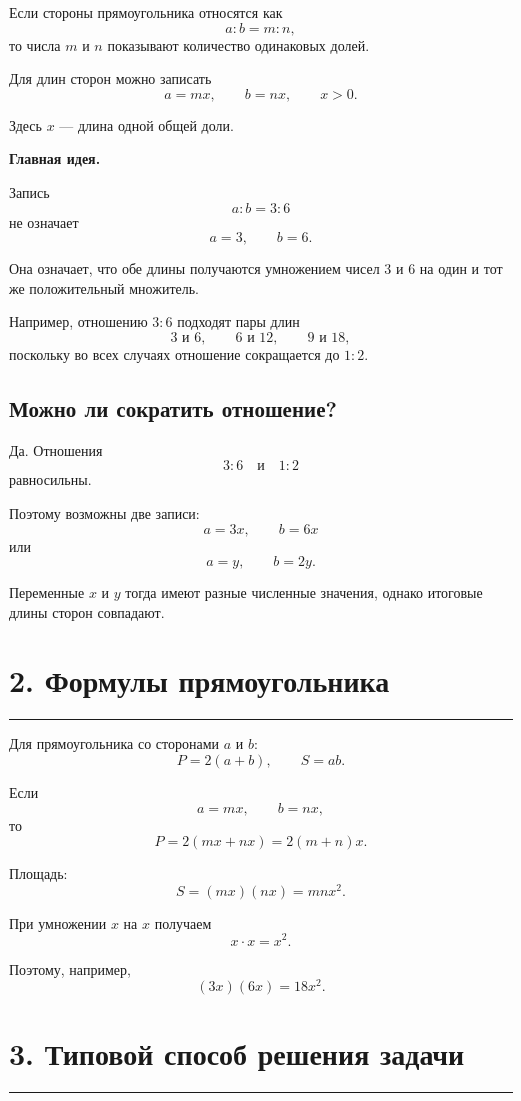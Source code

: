 \documentclass[a4paper,12pt]{article}
\newcommand{\sectionline}{%
  \par
  \noindent
  \color{accent}\rule{\linewidth}{0.45pt}
  \color{textgray}
  \par
}
\begin{document}
Если стороны прямоугольника относятся как
\[
a:b=m:n,
\]
то числа $m$ и $n$ показывают количество одинаковых долей.

Для длин сторон можно записать
\[
a=mx,
\qquad
b=nx,
\qquad
x>0.
\]

Здесь $x$ --- длина одной общей доли.

\begin{keybox}
\textbf{Главная идея.}

Запись
\[
a:b=3:6
\]
не означает
\[
a=3,
\qquad
b=6.
\]

Она означает, что обе длины получаются умножением чисел $3$ и $6$ на один и тот же положительный множитель.
\end{keybox}

Например, отношению $3:6$ подходят пары длин
\[
3\text{ и }6,
\qquad
6\text{ и }12,
\qquad
9\text{ и }18,
\]
поскольку во всех случаях отношение сокращается до $1:2$.

\subsection*{Можно ли сократить отношение?}

Да. Отношения
\[
3:6
\quad\text{и}\quad
1:2
\]
равносильны.

Поэтому возможны две записи:
\[
a=3x,
\qquad
b=6x
\]
или
\[
a=y,
\qquad
b=2y.
\]

Переменные $x$ и $y$ тогда имеют разные численные значения, однако итоговые длины сторон совпадают.

\section*{2. Формулы прямоугольника}
\sectionline

Для прямоугольника со сторонами $a$ и $b$:
\[
P=2(a+b),
\qquad
S=ab.
\]

Если
\[
a=mx,
\qquad
b=nx,
\]
то
\[
P=2(mx+nx)=2(m+n)x.
\]

Площадь:
\[
S=(mx)(nx)=mnx^2.
\]

\begin{keybox}
При умножении $x$ на $x$ получаем
\[
x\cdot x=x^2.
\]

Поэтому, например,
\[
(3x)(6x)=18x^2.
\]
\end{keybox}

\section*{3. Типовой способ решения задачи}
\sectionline
\end{document}
